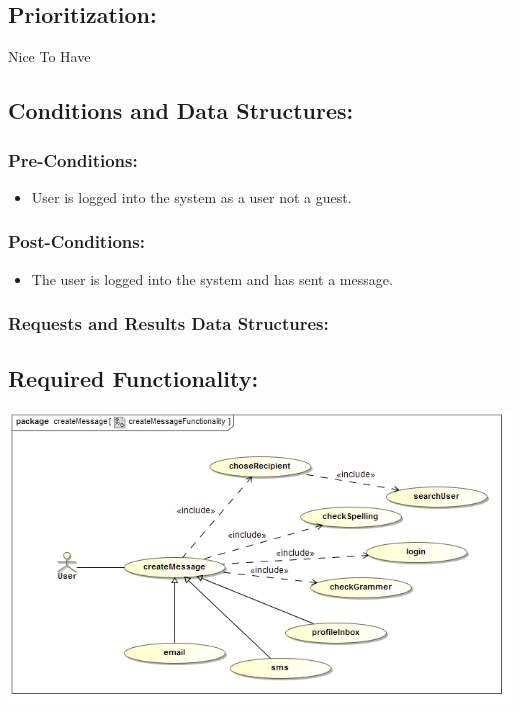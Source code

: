 \documentclass[a4paper,11pt]{article}
\begin{document}
\subsection{Prioritization:} 
\textbf{}Nice To Have
\subsection{Conditions and Data Structures:}
\subsubsection*{Pre-Conditions:}
\begin{itemize}
\item User is logged into the system as a user not a guest. 
\end{itemize}
\subsubsection*{Post-Conditions:}
\begin{itemize}
\item The user is logged into the system and has sent a message.
\end{itemize}
\subsubsection*{Requests and Results Data Structures:}
\subsection{Required Functionality:} 
\includegraphics[width=1\linewidth]{./Images/PrivateMessage/createMessageFunctionality}
\end{document}
